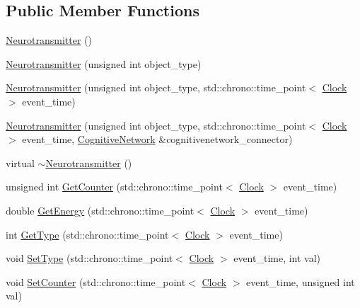 \subsection*{Public Member Functions}
\begin{DoxyCompactItemize}
\item 
\mbox{\hyperlink{classNeurotransmitter_a05883c62f2c20b8034121a46c50de00f}{Neurotransmitter}} ()
\item 
\mbox{\hyperlink{classNeurotransmitter_adca6f02b1a9c98d269e3909e1e2f0463}{Neurotransmitter}} (unsigned int object\+\_\+type)
\item 
\mbox{\hyperlink{classNeurotransmitter_ac1c768a2769536a8a16569ae0dde1671}{Neurotransmitter}} (unsigned int object\+\_\+type, std\+::chrono\+::time\+\_\+point$<$ \mbox{\hyperlink{universe_8h_a0ef8d951d1ca5ab3cfaf7ab4c7a6fd80}{Clock}} $>$ event\+\_\+time)
\item 
\mbox{\hyperlink{classNeurotransmitter_ac9257a1b310a26eba8a08ffb4b93bb64}{Neurotransmitter}} (unsigned int object\+\_\+type, std\+::chrono\+::time\+\_\+point$<$ \mbox{\hyperlink{universe_8h_a0ef8d951d1ca5ab3cfaf7ab4c7a6fd80}{Clock}} $>$ event\+\_\+time, \mbox{\hyperlink{classCognitiveNetwork}{Cognitive\+Network}} \&cognitivenetwork\+\_\+connector)
\item 
virtual \mbox{\hyperlink{classNeurotransmitter_a0ea63f67dc5a49d485b7a7034a8f7968}{$\sim$\+Neurotransmitter}} ()
\item 
unsigned int \mbox{\hyperlink{classNeurotransmitter_a94b3d1909cdd787f0583e28e1e9b58dd}{Get\+Counter}} (std\+::chrono\+::time\+\_\+point$<$ \mbox{\hyperlink{universe_8h_a0ef8d951d1ca5ab3cfaf7ab4c7a6fd80}{Clock}} $>$ event\+\_\+time)
\item 
double \mbox{\hyperlink{classNeurotransmitter_a1e3e8134ea935f617b0afd2f7b5b5799}{Get\+Energy}} (std\+::chrono\+::time\+\_\+point$<$ \mbox{\hyperlink{universe_8h_a0ef8d951d1ca5ab3cfaf7ab4c7a6fd80}{Clock}} $>$ event\+\_\+time)
\item 
int \mbox{\hyperlink{classNeurotransmitter_a45414c0d173758edbbf9318a7eccb623}{Get\+Type}} (std\+::chrono\+::time\+\_\+point$<$ \mbox{\hyperlink{universe_8h_a0ef8d951d1ca5ab3cfaf7ab4c7a6fd80}{Clock}} $>$ event\+\_\+time)
\item 
void \mbox{\hyperlink{classNeurotransmitter_ae460ed5fac92ba136a80bba12ebce246}{Set\+Type}} (std\+::chrono\+::time\+\_\+point$<$ \mbox{\hyperlink{universe_8h_a0ef8d951d1ca5ab3cfaf7ab4c7a6fd80}{Clock}} $>$ event\+\_\+time, int val)
\item 
void \mbox{\hyperlink{classNeurotransmitter_ae16ec051609867d4f64fad5ba4449443}{Set\+Counter}} (std\+::chrono\+::time\+\_\+point$<$ \mbox{\hyperlink{universe_8h_a0ef8d951d1ca5ab3cfaf7ab4c7a6fd80}{Clock}} $>$ event\+\_\+time, unsigned int val)

\end{DoxyCompactItemize}
